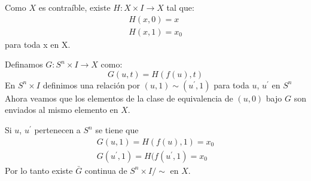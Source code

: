 \begin{Dem}
Como $X$ es contraíble, existe $H\colon X\times I \rightarrow X$ tal que:
\begin{eqnarray}
H(x,0)=x \\
H(x,1) = x_0
\end{eqnarray}
para toda x en X.

Definamos $G\colon S^n\times I \rightarrow X$ como:
\begin{equation}
G(u,t) = H(f(u),t)
\end{equation}
En $S^n\times I$ definimos una relación por $(u,1)\sim(u^{'},1)$ para toda $u$, $u^{'}$ en $S^n$
Ahora veamos que los elementos de la clase de equivalencia de $(u,0)$ bajo $G$ son enviados al mismo elemento en $X$.

Si $u$, $u^{'}$ pertenecen a $S^n$ se tiene que
\begin{eqnarray}
G(u,1) = H(f(u),1) = x_0\\
G(u^{'},1)=H(f(u^{'},1) = x_0
\end{eqnarray}
Por lo tanto existe $\bar{G}$ continua de $S^n\times I /{\sim}$ en $X$.
\end{Dem}